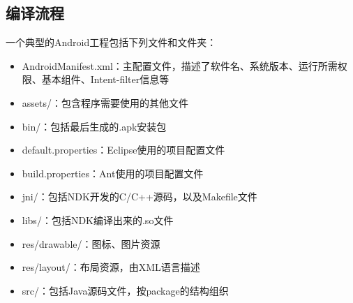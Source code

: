 \subsection{编译流程}
一个典型的Android工程包括下列文件和文件夹：
\begin{itemize}
	\item AndroidManifest.xml：主配置文件，描述了软件名、系统版本、运行所需权限、基本组件、Intent-filter信息等
	\item assets/：包含程序需要使用的其他文件
	\item bin/：包括最后生成的.apk安装包
	\item default.properties：Eclipse使用的项目配置文件
	\item build.properties：Ant使用的项目配置文件
	\item jni/：包括NDK开发的C/C++源码，以及Makefile文件
	\item libs/：包括NDK编译出来的.so文件
	\item res/drawable/：图标、图片资源
	\item res/layout/：布局资源，由XML语言描述
	\item src/：包括Java源码文件，按package的结构组织
\end{itemize}

